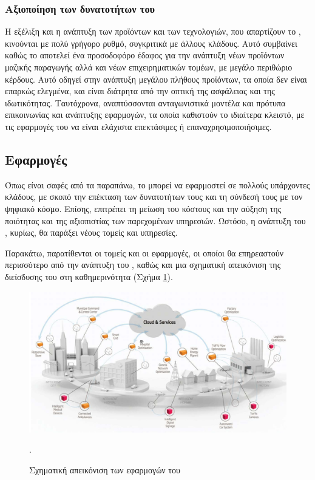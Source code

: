 \subsubsection{Αξιοποίηση των δυνατοτήτων του }
Η εξέλιξη και η ανάπτυξη των προϊόντων και των τεχνολογιών, που απαρτίζουν το , κινούνται με πολύ γρήγορο ρυθμό, συγκριτικά με άλλους κλάδους. 
Αυτό συμβαίνει καθώς το  αποτελεί ένα προσοδοφόρο έδαφος για την ανάπτυξη νέων προϊόντων μαζικής παραγωγής αλλά και νέων επιχειρηματικών τομέων, με μεγάλο περιθώριο κέρδους. 
Αυτό οδηγεί στην ανάπτυξη μεγάλου πλήθους προϊόντων, τα οποία δεν είναι επαρκώς ελεγμένα, και είναι διάτρητα από την οπτική της ασφάλειας και της ιδωτικότητας. 
Ταυτόχρονα, αναπτύσσονται ανταγωνιστικά μοντέλα και πρότυπα επικοινωνίας και ανάπτυξης εφαρμογών, τα οποία καθιστούν το  ιδιαίτερα κλειστό, με τις εφαρμογές του να είναι ελάχιστα επεκτάσιμες ή επαναχρησιμοποιήσιμες. 
\subsection{Εφαρμογές}
Όπως είναι σαφές από τα παραπάνω, το  μπορεί να εφαρμοστεί σε πολλούς υπάρχοντες κλάδους, με σκοπό την επέκταση των δυνατοτήτων τους και τη σύνδεσή τους με τον ψηφιακό κόσμο.
Επίσης, επιτρέπει τη μείωση του κόστους και την αύξηση της ποιότητας και της αξιοπιστίας των παρεχομένων υπηρεσιών. 
Ωστόσο, η ανάπτυξη του , κυρίως, θα παράξει νέους τομείς και υπηρεσίες.
\par
Παρακάτω, παρατίθενται οι τομείς και οι εφαρμογές, οι οποίοι θα επηρεαστούν περισσότερο από την ανάπτυξη του , καθώς και μια σχηματική απεικόνιση της διείσδυσης του  στη καθημερινότητα (Σχήμα \ref{iotapp}).
\begin{figure}[h!]
\centering
\includegraphics[scale=0.6]{images/iot_applications.png}
\caption{Σχηματική απεικόνιση των εφαρμογών του  \cite{iot_applications}}.
\label{iotapp}
\end{figure}

